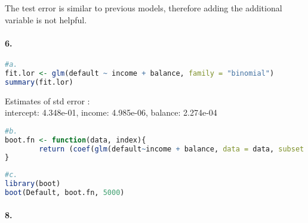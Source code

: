 \documentclass[11pt]{report}
\begin{document}
The test error is similar to previous models, therefore adding the additional variable is not helpful.

\paragraph{6. }

\begin{lstlisting}[language=R, breaklines=true, basicstyle=\ttfamily]
#a.
fit.lor <- glm(default ~ income + balance, family = "binomial")
summary(fit.lor)
\end{lstlisting}

Estimates of std error : \\intercept: 4.348e-01, income: 4.985e-06, balance: 2.274e-04

\begin{lstlisting}[language=R, breaklines=true, basicstyle=\ttfamily]
#b.
boot.fn <- function(data, index){
        return (coef(glm(default~income + balance, data = data, subset = index, family = "binomila")))
}
\end{lstlisting}

\begin{lstlisting}[language=R, breaklines=true, basicstyle=\ttfamily]
#c.
library(boot)
boot(Default, boot.fn, 5000)
\end{lstlisting}


\paragraph{8. }
\end{document}
